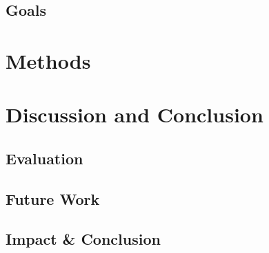 \documentclass{article}
\begin{document}
\subsection{Goals}

\section{Methods}

\section{Discussion and Conclusion}
\subsection{Evaluation}
\subsection{Future Work}
\subsection{Impact \& Conclusion}


\printbibliography
\end{document}
